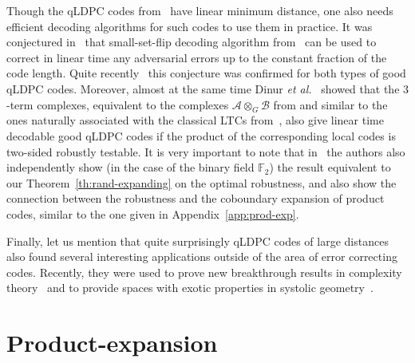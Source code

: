 \documentclass[11pt]{article}
\theoremstyle{plain}
\theoremstyle{definition}
\theoremstyle{remark}
\newcommand{\cA}{\mathcal{A}}
\newcommand{\cB}{\mathcal{B}}
\newcommand{\F}{\mathbb{F}}
\begin{document}
Though the qLDPC codes from~\cite{Panteleev&Kalachev:stoc2022, Leverrier:focs2022} have linear minimum distance, one also needs efficient decoding algorithms for such codes to use them in practice. It was conjectured in~\cite{Panteleev&Kalachev:stoc2022} that small-set-flip decoding algorithm from~\cite{Leverrier:2015} can be used to correct in linear time any adversarial errors up to the constant fraction of the code length. Quite recently~\cite{Gu:stoc2023:qpdpc-decoder, Leverrier:qldpcdecoder:2023} this conjecture was confirmed for both types of good qLDPC codes. Moreover, almost at the same time Dinur \emph{et al.}~\cite{Dinur:decoders} showed that the $3$-term complexes, equivalent to the complexes $\cA \otimes_G \cB$ from \cite[Remark on p.~379]{Panteleev&Kalachev:stoc2022} and similar to the ones naturally associated with the classical LTCs from~\cite{Dinur:stoc2022}, also give linear time decodable  good qLDPC codes if the product of the corresponding local codes is two-sided robustly testable. It is very important to note that in~\cite{Dinur:decoders} the authors also independently show (in the case of the binary field $\F_2$) the result equivalent to our Theorem~\ref{th:rand-expanding} on the optimal robustness, and also show the connection between the robustness and the coboundary expansion of product codes, similar to the one given in Appendix~\ref{app:prod-exp}. 


Finally, let us mention that quite surprisingly qLDPC codes of large distances also found several interesting applications outside of the area of error correcting codes. Recently, they were used to prove new breakthrough results in complexity theory~\cite{Hopkins:focs2022, Anshu:stoc2023} and to provide spaces with exotic properties in systolic geometry~\cite{Freedman:2021}.


\section{Product-expansion}
\end{document}
